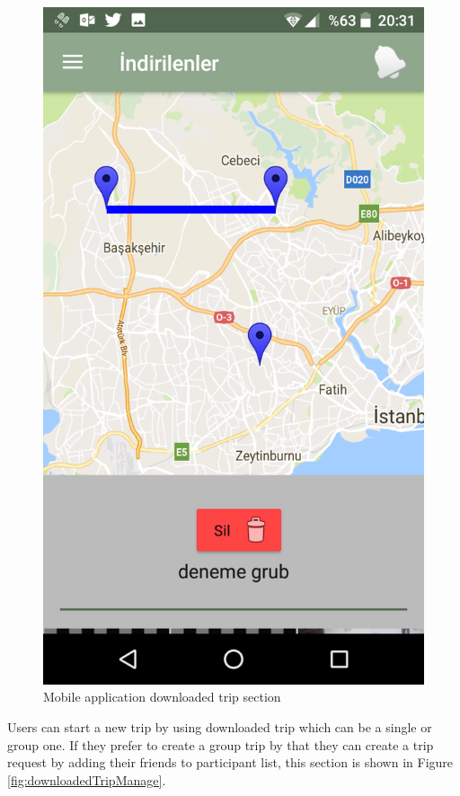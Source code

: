 \begin{figure}[!htbp]
\centering
\includegraphics[scale=0.2]{projectChapters/images/downloadedTrip.png}
\caption{Mobile application downloaded trip section}
\label{fig:downloadedTrip}
\end{figure}

Users can start a new trip by using downloaded trip which can be a single or group one. If they prefer to create a group trip by that they can create a trip request by adding their friends to   participant list, this section is shown in Figure \ref{fig:downloadedTripManage}.


